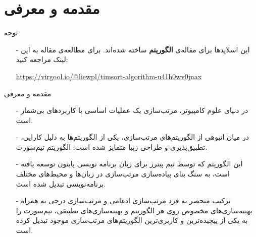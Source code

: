 \section{مقدمه و معرفی}
\begin{frame}{توجه}
\begin{itemize}\itemr
\item[-]
این اسلاید‌ها برای مقاله‌ی \textbf{الگوریتم } ساخته شده‌اند. برای مطالعه‌ی مقاله به این لینک مراجعه کنید:

\begin{flushleft}
\url{https://virgool.io/@liewpl/timsort-algorithm-u41h0wv0jnax}
\end{flushleft}\end{itemize}
\end{frame}
\begin{frame}{مقدمه و معرفی}
\begin{itemize}\itemr
\item[-]
در دنیای علوم کامپیوتر، مرتب‌سازی یک عملیات اساسی با کاربرد‌های بی‌شمار است.

\item[-]
در میان انبوهی از الگوریتم‌های مرتب‌سازی، یکی از الگوریتم‌ها به دلیل کارایی، تطبیق‌پذیری و طراحی زیبا متمایز شده است: الگوریتم تیم‌سورت.

\item[-]
این الگوریتم که توسط تیم پیترز برای زبان برنامه نویسی پایتون توسعه یافته است، به سنگ بنای پیاده‌سازی مرتب‌سازی در زبان‌ها و محیط‌های مختلف برنامه‌نویسی تبدیل شده است.

\item[-]
ترکیب منحصر به فرد مرتب‌سازی ادغامی و مرتب‌سازی درجی به همراه‌ بهینه‌سازی‌های مخصوص روی هر الگوریتم و بهینه‌سازی‌های تطبیقی‌، تیم‌سورت را به یکی از پیچیده‌ترین و کاربری‌ترین الگوریتم‌های مرتب‌سازی موجود تبدیل کرده است.
\end{itemize}
\end{frame}
